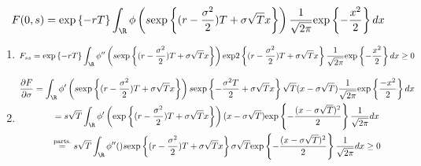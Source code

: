 \begin{prf}[]{}
  \begin{equation*}
    \begin{gathered}
      F(0,s) = \text{exp}\left\{-rT\right\}\int_\R\phi\left(s\text{exp}\left\{(r-\dfrac{\sigma^2}{2})T+\sigma\sqrt{T}x\right\}\right)\dfrac{1}{\sqrt{2\pi}}\text{exp}\left\{-\dfrac{x^2}{2}\right\}dx
    \end{gathered}
  \end{equation*}\par
  \begin{enumerate}[leftmargin=*]
    \item
      \begin{equation*}
        \begin{gathered}
          F_{ss} = \text{exp}\left\{-rT\right\}\int_\R\phi^{\prime\prime}\left(s\text{exp}\left\{(r-\dfrac{\sigma^2}{2})T+\sigma\sqrt{T}x\right\}\right)\text{exp}2\left\{(r-\dfrac{\sigma^2}{2})T+\sigma\sqrt{T}x\right\}\dfrac{1}{\sqrt{2\pi}}\text{exp}\left\{-\dfrac{x^2}{2}\right\}dx\geq0
        \end{gathered}
      \end{equation*}
      \par\bigskip
    \item
      \begin{equation*}
        \begin{gathered}
          \dfrac{\partial F}{\partial \sigma}=\int_\R\phi^{\prime}\left(s\text{exp}\left\{(r-\dfrac{\sigma^2}{2})T+\sigma\sqrt{T}x\right\}\right)s\text{exp}\left\{-\dfrac{\sigma^2T}{2}+\sigma\sqrt{T}x\right\}\sqrt{T}(x-\sigma\sqrt{T})\dfrac{1}{\sqrt{2\pi}}\text{exp}\left\{\dfrac{-x^2}{2}\right\}dx\\
          = s\sqrt{T}\int_\R\phi^{\prime}\left(\text{exp}\left\{(r-\dfrac{\sigma^2}{2})T+\sigma\sqrt{T}x\right\}\right)(x-\sigma\sqrt{T})\text{exp}\left\{-\dfrac{(x-\sigma\sqrt{T})^2}{2}\right\}\dfrac{1}{\sqrt{2\pi}}dx\\
          \stackrel{\text{parts.}}{=}s\sqrt{T}\int_\R\phi^{\prime\prime}()s\text{exp}\left\{(r-\dfrac{\sigma^2}{2})T+\sigma\sqrt{T}x\right\}\sigma\sqrt{T}\text{exp}\left\{-\dfrac{(x-\sigma\sqrt{T})^2}{2}\right\}\dfrac{1}{\sqrt{2\pi}}dx\geq0
        \end{gathered}
      \end{equation*}
  \end{enumerate}
\end{prf}

